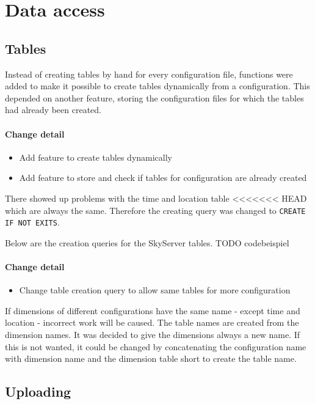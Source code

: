 \section{Data access}

\subsection{Tables}

Instead of creating tables by hand for every configuration file, functions
were added to make it possible to create tables dynamically from
a configuration. This depended on another feature,
storing the configuration files for which the tables had already been created.

\paragraph{Change detail}
\begin{itemize}
  \item Add feature to create tables dynamically
  \item Add feature to store and check if tables for configuration are already created
\end{itemize}

There showed up problems with the time and location table
<<<<<<< HEAD
which are always the same. Therefore the creating query
was changed to \texttt{CREATE IF NOT EXITS}.

Below are the creation queries for the SkyServer tables.
TODO codebeispiel

\paragraph{Change detail}
\begin{itemize}
  \item Change table creation query to allow same tables for more configuration
\end{itemize}

If dimensions of different configurations have the same name - except time and location - 
incorrect work will be caused. The table names are created from the dimension names.
It was decided to give the dimensions always a new name. If this is
not wanted, it could be changed by concatenating
the configuration name with dimension name and the dimension table short
to create the table name.

\subsection{Uploading}
